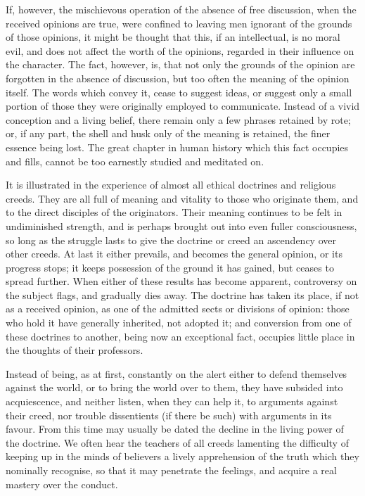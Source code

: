 If, however, the mischievous operation of the absence of free discussion, when the received opinions are true, were confined to leaving men ignorant of the grounds of those opinions, it might be thought that this, if an intellectual, is no moral evil, and does not affect the worth of the opinions, regarded in their influence on the character. The fact, however, is, that not only the grounds of the opinion are forgotten in the absence of discussion, but too often the meaning of the opinion itself. The words which convey it, cease to suggest ideas, or suggest only a small portion of those they were originally employed to communicate. Instead of a vivid conception and a living belief, there remain only a few phrases retained by rote; or, if any part, the shell and husk only of the meaning is retained, the finer essence being lost. The great chapter in human history which this fact occupies and fills, cannot be too earnestly studied and meditated on.\par

It is illustrated in the experience of almost all ethical doctrines and religious creeds. They are all full of meaning and vitality to those who originate them, and to the direct disciples of the originators. Their meaning continues to be felt in undiminished strength, and is perhaps brought out into even fuller consciousness, so long as the struggle lasts to give the doctrine or creed an ascendency over other creeds. At last it either prevails, and becomes the general opinion, or its progress stops; it keeps possession of the ground it has gained, but ceases to spread further. When either of these results has become apparent, controversy on the subject flags, and gradually dies away. The doctrine has taken its place, if not as a received opinion, as one of the admitted sects or divisions of opinion: those who hold it have generally inherited, not adopted it; and conversion from one of these doctrines to another, being now an exceptional fact, occupies little place in the thoughts of their professors.\par

Instead of being, as at first, constantly on the alert either to defend themselves against the world, or to bring the world over to them, they have subsided into acquiescence, and neither listen, when they can help it, to arguments against their creed, nor trouble dissentients (if there be such) with arguments in its favour. From this time may usually be dated the decline in the living power of the doctrine. We often hear the teachers of all creeds lamenting the difficulty of keeping up in the minds of believers a lively apprehension of the truth which they nominally recognise, so that it may penetrate the feelings, and acquire a real mastery over the conduct.\par

